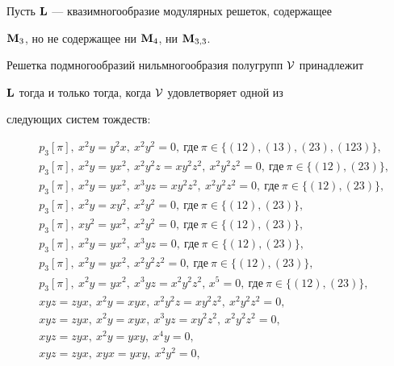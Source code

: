\begin{thmnonum}


Пусть $\bold L$ --- квазимногообразие модулярных решеток, содержащее


$\bold M_3$, но не содержащее ни $\bold M_4$, ни $\bold M_{3,3}$.


Решетка подмногообразий нильмногообразия полугрупп $\cal V$ принадлежит


$\bold L$ тогда и только тогда, когда $\cal V$ удовлетворяет одной из


следующих систем тождеств\/${:}$


\begin{align*}


&p_3[\pi],\ x^2y=y^2x,\ x^2y^2=0,\ \text{где}\ \pi\in\{(12),(13),(23),


(123)\},\\


&p_3[\pi],\ x^2y=yx^2,\ x^2y^2z=xy^2z^2,\ x^2y^2z^2=0,\ \text{где}\ \pi\in


\{(12),(23)\},\\


&p_3[\pi],\ x^2y=yx^2,\ x^3yz=xy^2z^2,\ x^2y^2z^2=0,\ \text{где}\ \pi\in


\{(12),(23)\},\\


&p_3[\pi],\ x^2y=xy^2,\ x^2y^2=0,\ \text{где}\ \pi\in\{(12),(23)\},\\


&p_3[\pi],\ xy^2=yx^2,\ x^2y^2=0,\ \text{где}\ \pi\in\{(12),(23)\},\\


&p_3[\pi],\ x^2y=yx^2,\ x^3yz=0,\ \text{где}\ \pi\in\{(12),(23)\},\\


&p_3[\pi],\ x^2y=yx^2,\ x^2y^2z^2=0,\ \text{где}\ \pi\in\{(12),(23)\},\\


&p_3[\pi],\ x^2y=yx^2,\ x^3yz=x^2y^2z^2,\,x^5=0,\ \text{где}\ \pi\in\{(12),


(23)\},\\


&xyz=zyx,\ x^2y=xyx,\ x^2y^2z=xy^2z^2,\ x^2y^2z^2=0,\\


&xyz=zyx,\ x^2y=xyx,\ x^3yz=xy^2z^2,\ x^2y^2z^2=0,\\


&xyz=zyx,\ x^2y=yxy,\ x^4y=0,\\


&xyz=zyx,\ xyx=yxy,\ x^2y^2=0,\\



\end{align*}
\end{thmnonum}
